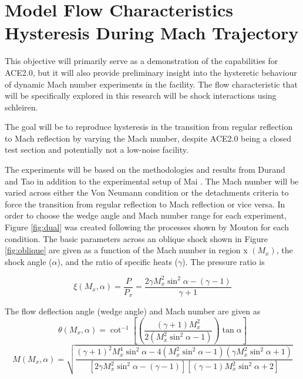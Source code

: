 \section{Model Flow Characteristics Hysteresis During Mach Trajectory}

This objective will primarily serve as a demonstration of the capabilities for ACE2.0, but it will also provide preliminary insight into the hysteretic behaviour of dynamic Mach number experiments in the facility. The flow characteristic that will be specifically explored in this research will be shock interactions using schleiren.

The goal will be to reproduce hysteresis in the transition from regular reflection to Mach reflection by varying the Mach number, despite ACE2.0 being a closed test section and potentially not a low-noise facility. 

The experiments will be based on the methodologies and results from Durand \cite{durand} and Tao \cite{tao} in addition to the experimental setup of Mai \cite{mai-dis}. The Mach number will be varied across either the Von Neumann condition or the detachments criteria to force the transition from regular reflection to Mach reflection or vice versa. In order to choose the wedge angle and Mach number range for each experiment, Figure \ref{fig:dual} was created following the processes shown by Mouton \cite{mouton} for each condition. The basic parameters across an oblique shock shown in Figure \ref{fig:oblique} are given as a function of the Mach number in region x $\left(M_x\right)$, the shock angle ($\alpha$), and the ratio of specific heats ($\gamma$). The pressure ratio is 

\begin{equation}
    \xi \left(M_x,\alpha\right) = \frac{P}{P_x} = \frac{2 \gamma M_x^2 \sin^2{\alpha} - (\gamma-1)}{\gamma+1}
\end{equation}

\noindent The flow deflection angle (wedge angle) and Mach number are given as
\begin{equation}
    \theta \left(M_x,\alpha\right) = \cot^{-1}{\left[ \left(\frac{(\gamma+1) M_x^2}{2\left(M_x^2 \sin^2{\alpha} - 1\right)}\right) \tan{\alpha} \right]}
\end{equation}
\begin{equation}
    M \left(M_x,\alpha\right) = \sqrt{\frac{(\gamma+1)^2 M_x^4 \sin^2{\alpha} - 4\left(M_x^2 \sin^2{\alpha} - 1\right)\left(\gamma M_x^2 \sin^2{\alpha} + 1\right)}{\left[2 \gamma M_x^2 \sin^2{\alpha} - (\gamma-1)\right]\left[(\gamma-1) M_x^2 \sin^2{\alpha} + 2\right]}}
\end{equation}

